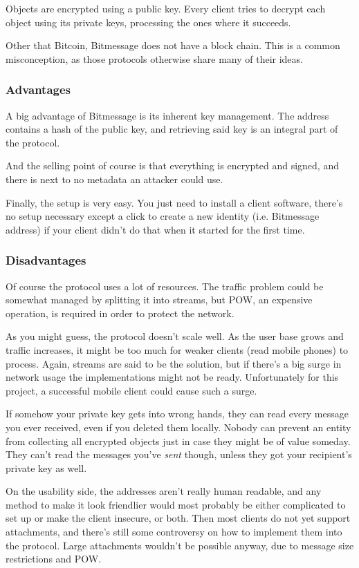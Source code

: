 \documentclass{bfh}
\begin{document}
  Objects are encrypted using a public key. Every client tries to decrypt each object using its private keys, processing the ones where it succeeds.

  Other that Bitcoin, Bitmessage does not have a block chain. This is a common misconception, as those protocols otherwise share many of their ideas.

  \subsubsection{Advantages}
  A big advantage of Bitmessage is its inherent key management. The address contains a hash of the public key, and retrieving said key is an integral part of the protocol.

  And the selling point of course is that everything is encrypted and signed, and there is next to no metadata an attacker could use.

  Finally, the setup is very easy. You just need to install a client software, there's no setup necessary except a click to create a new identity (i.e. Bitmessage address) if your client didn't do that when it started for the first time.

  \subsubsection{Disadvantages}
  Of course the protocol uses a lot of resources. The traffic problem could be somewhat managed by splitting it into streams\cite{wiki:stream}, but \acf{POW}, an expensive operation, is required in order to protect the network.

  As you might guess, the protocol doesn't scale well. As the user base grows and traffic increases, it might be too much for weaker clients (read mobile phones) to process. Again, streams are said to be the solution, but if there's a big surge in network usage the implementations might not be ready. Unfortunately for this project, a successful mobile client could cause such a surge.

  If somehow your private key gets into wrong hands, they can read every message you ever received, even if you deleted them locally. Nobody can prevent an entity from collecting all encrypted objects just in case they might be of value someday. They can't read the messages you've \textit{sent} though, unless they got your recipient's private key as well.

  On the usability side, the addresses aren't really human readable, and any method to make it look friendlier would most probably be either complicated to set up or make the client insecure, or both. Then most clients do not yet support attachments, and there's still some controversy on how to implement them into the protocol. Large attachments wouldn't be possible anyway, due to message size restrictions and \ac{POW}.
\end{document}
